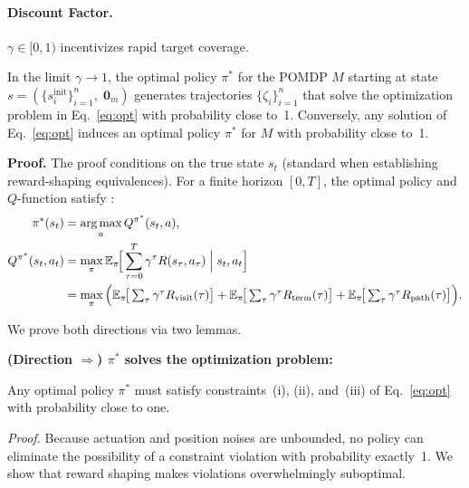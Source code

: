 \documentclass{article}
\begin{document}
\paragraph{Discount Factor.}
$\gamma \in [0,1)$ incentivizes rapid target coverage.

\begin{theorem}
\label{thm:optimization}
In the limit $\gamma \to 1$, the optimal policy $\pi^*$ for the POMDP $M$ starting at state $s = (\{s_i^{\mathrm{init}}\}_{i=1}^n,\; \mathbf{0}_m)$ generates trajectories $\{\zeta_i\}_{i=1}^n$ that solve the optimization problem in Eq.~\eqref{eq:opt} with probability close to~1. Conversely, any solution of Eq.~\eqref{eq:opt} induces an optimal policy $\pi^*$ for $M$ with probability close to~1.
\end{theorem}

\textbf{Proof.} The proof conditions on the true state $s_t$ (standard when establishing reward-shaping equivalences). For a finite horizon $[0,T]$, the optimal policy and $Q$-function satisfy \citep{sutton2018reinforcement}:
\begin{align}
    \pi^*(s_t) &= \operatorname*{arg\,max}_a Q^{\pi^*}(s_t, a), \label{eq:opt_pi} \\
    Q^{\pi^*}(s_t, a_t) &= \max_\pi \mathbb{E}_\pi\!\Big[\sum_{\tau=0}^T \gamma^\tau R(s_\tau, a_\tau) \;\Big|\; s_t, a_t\Big] \label{eq:opt_policy} \\
    &= \max_\pi \Big( \mathbb{E}_\pi\!\big[\textstyle\sum_\tau \gamma^\tau R_{\mathrm{visit}}(\tau)\big]
                    + \mathbb{E}_\pi\!\big[\textstyle\sum_\tau \gamma^\tau R_{\mathrm{term}}(\tau)\big]
                    + \mathbb{E}_\pi\!\big[\textstyle\sum_\tau \gamma^\tau R_{\mathrm{path}}(\tau)\big] \Big). \nonumber
\end{align}

We prove both directions via two lemmas.

\textbf{(Direction $\Rightarrow$) $\pi^*$ solves the optimization problem:}

\begin{lemma}
\label{lem:const}
Any optimal policy $\pi^*$ must satisfy constraints~\textnormal{(i)}, \textnormal{(ii)}, and~\textnormal{(iii)} of Eq.~\eqref{eq:opt} with probability close to one.
\end{lemma}

\textit{Proof.} Because actuation and position noises are unbounded, no policy can eliminate the possibility of a constraint violation with probability exactly~1. We show that reward shaping makes violations overwhelmingly suboptimal.
\end{document}
